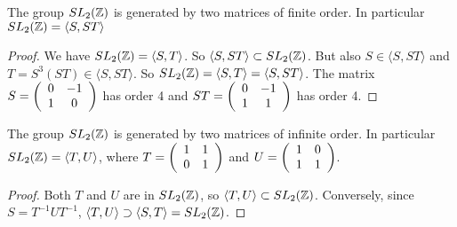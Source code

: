 \begin{corollary}\label{cor:genFiniteOrderSST}
The group $SL_2(\mathbb{Z})$ is generated by two matrices of finite order. In particular $SL_2(\mathbb{Z}) = \langle S, ST \rangle$
\end{corollary}
\begin{proof}
We have $SL_2(\mathbb{Z}) = \langle S, T \rangle$. So $\langle S, ST \rangle \subset SL_2(\mathbb{Z})$. But also $S \in \langle S, ST \rangle$ and $T = S^3(ST) \in \langle S, ST\rangle$. So $ SL_2(\mathbb{Z}) = \langle S, T \rangle =  \langle S, ST\rangle$. The matrix $S = \left(\begin{array}{ c c } 0 & -1 \\ 1 & 0 \end{array} \right)$ has order 4 and $ST = \left(\begin{array}{ c c } 0 & -1 \\ 1 & 1 \end{array} \right)$ has order 4.
\end{proof}

\begin{corollary}\label{cor:genInfiniteOrderUT}
The group $SL_2(\mathbb{Z})$ is generated by two matrices of infinite order. In particular $SL_2(\mathbb{Z}) = \langle T, U \rangle $, where $T = \left(\begin{array}{ c c } 1 & 1 \\ 0 & 1 \end{array} \right)$ and $U = \left(\begin{array}{ c c } 1 & 0 \\ 1 & 1 \end{array} \right)$.
\end{corollary}
\begin{proof}
Both $T$ and $U$ are in $SL_2(\mathbb{Z})$, so $\langle T, U \rangle \subset SL_2(\mathbb{Z})$. Conversely, since $S = T^{-1}UT^{-1}$, $\langle T, U \rangle \supset \langle S, T \rangle = SL_2(\mathbb{Z})$.
\end{proof}